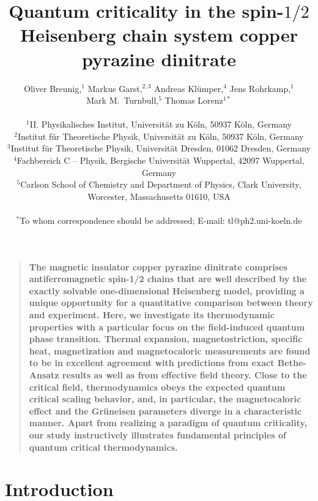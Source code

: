 \documentclass[12pt]{article}
\title{Quantum criticality in the spin-${1}/{2}$ 
Heisenberg chain system copper pyrazine dinitrate}
\author
{Oliver Breunig,${}^{1}$ Markus Garst,${}^{2,3}$ Andreas Kl\"{u}mper,${}^{4}$ Jens Rohrkamp,${}^{1}$ \\ Mark M.~Turnbull,${}^{5}$ Thomas Lorenz${}^{1\ast}$\\
\\
\normalsize{${}^{1}$II. Physikalisches Institut, Universit\"at zu K\"oln, 50937 K\"oln, Germany}\\ 
\normalsize{${}^{2}$Institut f\"ur Theoretische Physik, Universit\"at zu K\"oln, 50937 K\"oln, Germany}\\
\normalsize{${}^{3}$Institut f\"ur Theoretische Physik,   Universit\"at Dresden, 01062 Dresden, Germany}\\ 
\normalsize{${}^{4}$Fachbereich C -- Physik, Bergische Universit\"at Wuppertal, 42097 Wuppertal, Germany}\\
\normalsize{${}^{5}$Carlson School of Chemistry and Department of Physics, Clark University,}\\
\normalsize{Worcester, Massachusetts 01610, USA}\\
\\
\normalsize{$^\ast$To whom correspondence should be addressed; E-mail:  tl@ph2.uni-koeln.de}
}
\date{}
\newenvironment{sciabstract}{%
\begin{quote} \bf}
{\end{quote}}
\begin{document}
 


\baselineskip16pt


\maketitle 





\begin{sciabstract}
The magnetic insulator copper pyrazine dinitrate comprises antiferromagnetic spin-1/2 chains that are well described by the exactly solvable one-dimen\-sional Heisenberg model, providing a unique opportunity for a quantitative comparison between theory and experiment. Here, we investigate its thermodynamic properties with a particular focus on the field-induced quantum phase transition. Thermal expansion, magnetostriction, specific heat, magnetization and magnetocaloric measurements are found to be in excellent agreement with predictions from exact Bethe-Ansatz results as well as from effective field theory. Close to the critical field,  thermodynamics obeys the expected quantum critical scaling behavior, and, in particular, the magnetocaloric effect and the Gr\"uneisen parameters diverge in a characteristic manner. Apart from realizing a paradigm of quantum criticality, our study instructively illustrates fundamental principles of quantum critical thermodynamics.
\end{sciabstract}




\section*{Introduction}
\end{document}
